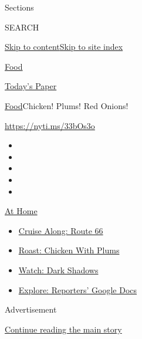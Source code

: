 Sections

SEARCH

\protect\hyperlink{site-content}{Skip to
content}\protect\hyperlink{site-index}{Skip to site index}

\href{https://www.nytimes3xbfgragh.onion/section/food}{Food}

\href{https://myaccount.nytimes3xbfgragh.onion/auth/login?response_type=cookie\&client_id=vi}{}

\href{https://www.nytimes3xbfgragh.onion/section/todayspaper}{Today's
Paper}

\href{/section/food}{Food}\textbar{}Chicken! Plums! Red Onions!

\url{https://nyti.ms/33bOs3o}

\begin{itemize}
\item
\item
\item
\item
\item
\end{itemize}

\href{https://www.nytimes3xbfgragh.onion/spotlight/at-home?action=click\&pgtype=Article\&state=default\&region=TOP_BANNER\&context=at_home_menu}{At
Home}

\begin{itemize}
\tightlist
\item
  \href{https://www.nytimes3xbfgragh.onion/2020/09/07/travel/route-66.html?action=click\&pgtype=Article\&state=default\&region=TOP_BANNER\&context=at_home_menu}{Cruise
  Along: Route 66}
\item
  \href{https://www.nytimes3xbfgragh.onion/2020/09/04/dining/sheet-pan-chicken.html?action=click\&pgtype=Article\&state=default\&region=TOP_BANNER\&context=at_home_menu}{Roast:
  Chicken With Plums}
\item
  \href{https://www.nytimes3xbfgragh.onion/2020/09/04/arts/television/dark-shadows-stream.html?action=click\&pgtype=Article\&state=default\&region=TOP_BANNER\&context=at_home_menu}{Watch:
  Dark Shadows}
\item
  \href{https://www.nytimes3xbfgragh.onion/interactive/2020/at-home/even-more-reporters-editors-diaries-lists-recommendations.html?action=click\&pgtype=Article\&state=default\&region=TOP_BANNER\&context=at_home_menu}{Explore:
  Reporters' Google Docs}
\end{itemize}

Advertisement

\protect\hyperlink{after-top}{Continue reading the main story}

